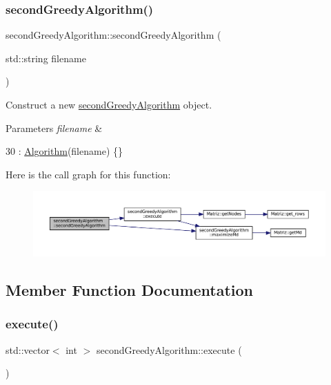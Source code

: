 \subsubsection{\texorpdfstring{second\+Greedy\+Algorithm()}{secondGreedyAlgorithm()}}
{\footnotesize\ttfamily second\+Greedy\+Algorithm\+::second\+Greedy\+Algorithm (\begin{DoxyParamCaption}\item[{std\+::string}]{filename }\end{DoxyParamCaption})\hspace{0.3cm}{\ttfamily [inline]}}



Construct a new \hyperlink{classsecondGreedyAlgorithm}{second\+Greedy\+Algorithm} object. 


\begin{DoxyParams}{Parameters}
{\em filename} & \\
\hline
\end{DoxyParams}

\begin{DoxyCode}
30 : \hyperlink{classAlgorithm_a89df1d2c6751f70733f38daa0ee2a13b}{Algorithm}(filename) \{\}
\end{DoxyCode}
Here is the call graph for this function\+:\nopagebreak
\begin{figure}[H]
\begin{center}
\leavevmode
\includegraphics[width=350pt]{classsecondGreedyAlgorithm_a0514ddce71b6343aaf54833c687a0fdf_cgraph}
\end{center}
\end{figure}


\subsection{Member Function Documentation}
\mbox{\label{classsecondGreedyAlgorithm_a119a730116003d00438179ccf4e2cafd}} 
\subsubsection{\texorpdfstring{execute()}{execute()}}
{\footnotesize\ttfamily std\+::vector$<$ int $>$ second\+Greedy\+Algorithm\+::execute (\begin{DoxyParamCaption}{ }\end{DoxyParamCaption})\hspace{0.3cm}{\ttfamily [virtual]}}



